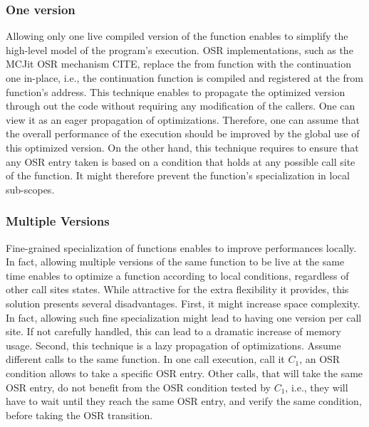 \subsubsection{One version}
Allowing only one live compiled version of the function enables to simplify the high-level model of the program's execution.
OSR implementations, such as the MCJit OSR mechanism CITE, replace the from function with the continuation one in-place, i.e., the continuation function is compiled and registered at the from function's address.
This technique enables to propagate the optimized version through out the code without requiring any modification of the callers.
One can view it as an eager propagation of optimizations.
Therefore, one can assume that the overall performance of the execution should be improved by the global use of this optimized version.
On the other hand, this technique requires to ensure that any OSR entry taken is based on a condition that holds at any possible call site of the function.
It might therefore prevent the function's specialization in local sub-scopes.\\ %

\subsubsection{Multiple Versions}
Fine-grained specialization of functions enables to improve performances locally.
In fact, allowing multiple versions of the same function to be live at the same time enables to optimize a function according to local conditions, regardless of other call sites states.
While attractive for the extra flexibility it provides, this solution presents several disadvantages.
First, it might increase space complexity.
In fact, allowing such fine specialization might lead to having one version per call site.
If not carefully handled, this can lead to a dramatic increase of memory usage.
Second, this technique is a lazy propagation of optimizations.
Assume different calls to the same function.
In one call execution, call it $C_1$, an OSR condition allows to take a specific OSR entry.
Other calls, that will take the same OSR entry, do not benefit from the OSR condition tested by $C_1$, i.e., they will have to wait until they reach the same OSR entry, and verify the same condition, before taking the OSR transition.



